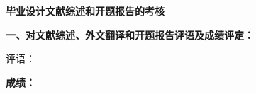 \thispagestyle{empty}

{
  \setlength{\parindent}{0em}
  \renewcommand{\baselinestretch}{2}

  {
    \stfangsong\sanhao\bfseries
    \centering
    毕业设计文献综述和开题报告的考核 \par
  }

  {
    \kaiti\sihao\bfseries
    一、对文献综述、外文翻译和开题报告评语及成绩评定：
    
    {\songti
    评语：}

    \vspace{12em}





  }

  \vspace{2em}

  {
    \songti\sihao\bfseries
    成绩：

    \vspace{12em}

    {
      \renewcommand{\baselinestretch}{1}

      \begin{flushright}



\end{flushright}}}}
